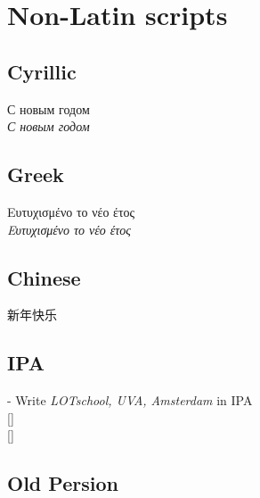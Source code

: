\chapter{Non-Latin scripts}
\section{Cyrillic}
С новым годом\\
\itshape
С новым годом\\
\upshape 

\section{Greek}
Ευτυχισμένο το νέο έτος\\
{\itshape Ευτυχισμένο το νέο έτος}\\
 
\section{Chinese} 
\newfontfamily{}
\newcommand{\zh}[1]{{\cn #1}} 
{\cn 新年快乐}

\section{IPA}
- Write \textit{LOTschool, UVA, Amsterdam} in IPA\\{}
[\textipa{"lO\|[t sxo:l, "y:fa:, Amst@r"\|[dAm}]\\{}
[]
 
\section{Old Persion}
 